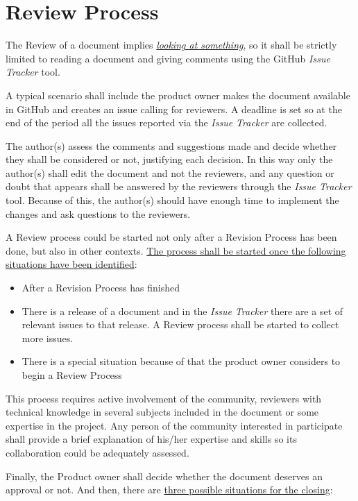 \documentclass{template/openetcs_article}
\begin{document}
\section{Review Process}
The Review of a document implies {\it\underline{looking at something}}, so it shall be strictly limited to reading a document and giving comments using the GitHub {\it Issue Tracker} tool. 

A typical scenario shall include the product owner makes the document available in GitHub and creates an issue calling for reviewers. A deadline is set so at the end of the period all the issues reported via the {\it Issue Tracker} are collected. 

The author(s) assess the comments and suggestions made and decide whether they shall be considered or not, justifying each decision. In this way only the author(s) shall edit the document and not the reviewers, and any question or doubt that appears shall be answered by the reviewers through the {\it Issue Tracker} tool. Because of this, the author(s) should have enough time to implement the changes and ask questions to the reviewers.

A Review process could be started not only after a Revision Process has been done, but also in other contexts. \underline{The process shall be started once the following situations have been identified}:

\begin{itemize}
\item After a Revision Process has finished
\item There is a release of a document and in the {\it Issue Tracker} there are a set of relevant issues to that release. A Review process shall be started to collect more issues.
\item There is a special situation because of that the product owner considers to begin a Review Process 
\end{itemize}

This process requires active involvement of the community, reviewers with technical knowledge in several subjects included in the document or some expertise in the project. Any person of the community interested in participate shall provide a brief explanation of his/her expertise and skills so its collaboration could be adequately assessed.

Finally, the Product owner shall decide whether the document deserves an approval or not. And then, there are \underline{three possible situations for the closing}:
\end{document}
